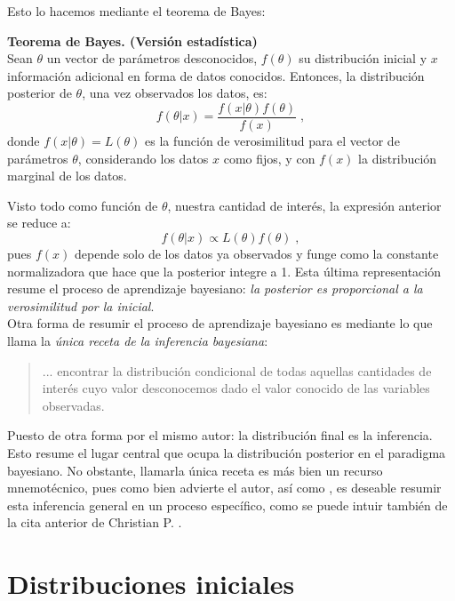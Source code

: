 Esto lo hacemos mediante el teorema de Bayes: 

\begin{teo} \label{teo:Bayes_2}
\textbf{Teorema de Bayes. (Versión estadística)}\\
Sean $\theta$ un vector de parámetros desconocidos, $f(\theta)$ su distribución inicial y $x$ información adicional en forma de datos conocidos. Entonces, la distribución posterior de $\theta$, una vez observados los datos, es: 
\begin{equation*}
f(\theta|x)=\dfrac{f(x|\theta)f(\theta)}{f(x)}\;,
\end{equation*}
donde $f(x|\theta) = L(\theta)$ es la función de verosimilitud para el vector de parámetros $\theta$, considerando los datos $x$ como fijos, y con $f(x)$ la distribución marginal de los datos. 
\end{teo}

Visto todo como función de $\theta$, nuestra cantidad de interés, la expresión anterior se reduce a:  
\begin{equation} \label{equation:Bayes_Prop}
f(\theta|x) \propto L(\theta)f(\theta)\;,
\end{equation}
pues $f(x)$ depende solo de los datos ya observados y funge como la constante normalizadora que hace que la posterior integre a 1. Esta última representación resume el proceso de aprendizaje bayesiano: \textit{la posterior es proporcional a la verosimilitud por la inicial}.\\ 

Otra forma de resumir el proceso de aprendizaje bayesiano es mediante lo que \textcite{GP16} llama la \textit{única receta de la inferencia bayesiana}: 
\begin{quote}
... encontrar la distribución condicional de todas aquellas cantidades de interés cuyo valor desconocemos dado el valor conocido de las variables observadas.
\end{quote}
Puesto de otra forma por el mismo autor: la distribución final es la inferencia. Esto resume el lugar central que ocupa la distribución posterior en el paradigma bayesiano. No obstante, llamarla única receta es más bien un recurso mnemotécnico, pues como bien advierte el autor, así como \textcite{Berger85}, es deseable resumir esta inferencia general en un proceso específico, como se puede intuir también de la cita anterior de Christian P. \textcite{Robert07}. 

\section{Distribuciones iniciales}

